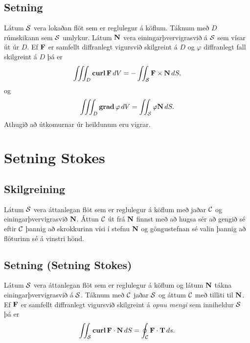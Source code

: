 \documentclass[a4paper,10pt,icelandic]{sphinxmanual}
\begin{document}
\subsection{Setning}
\label{Kafli6:id10}
Látum \(\cal S\) vera lokaðan flöt sem er reglulegur á köflum.
Táknum með \(D\) rúmskikann sem \(\cal S\) umlykur. Látum
\(\mbox{${\bf N}$}\) vera einingarþvervigrasvið á \(\cal S\) sem
vísar út úr \(D\). Ef \(\mbox{${\bf F}$}\) er samfellt
diffranlegt vigursvið skilgreint á \(D\) og \(\varphi\)
diffranlegt fall skilgreint á \(D\) þá er
\begin{gather}
\begin{split}\displaystyle \int\!\!\!\int\!\!\!\int_D\mbox{${\rm\bf curl\,}$}\mbox{${\bf F}$}\,dV=-\int\!\!\!\int_{\cal S}\mbox{${\bf F}$}\times\mbox{${\bf N}$}\,dS,\end{split}\notag
\end{gather}
og
\begin{gather}
\begin{split}\displaystyle \int\!\!\!\int\!\!\!\int_D\mbox{${\rm\bf grad\,}$}\varphi\,dV=\int\!\!\!\int_{\cal S}\varphi\mbox{${\bf N}$}\,dS.\end{split}\notag
\end{gather}
Athugið að útkomurnar úr heildunum eru vigrar.


\section{Setning Stokes}
\label{Kafli6:setning-stokes}

\subsection{Skilgreining}
\label{Kafli6:id11}
Látum \(\cal S\) vera áttanlegan flöt sem er reglulegur á köflum með
jaðar \(\cal C\) og einingarþvervigrasvið \(\mbox{${\bf N}$}\).
Áttun \(\cal C\) út frá \(\mbox{${\bf N}$}\) finnst með að hugsa
sér að gengið sé eftir \(\cal C\) þannig að skrokkurinn vísi í
stefnu \(\mbox{${\bf N}$}\) og göngustefnan sé valin þannig að
flöturinn sé á vinstri hönd.


\subsection{Setning (Setning Stokes)}
\label{Kafli6:setning-setning-stokes}
Látum \(\cal S\) vera áttanlegan flöt sem er reglulegur á köflum og
látum \(\mbox{${\bf N}$}\) tákna einingarþvervigrasvið á
\(\cal S\). Táknum með \(\cal C\) jaðar \(\cal S\) og áttum
\(\cal C\) með tilliti til \(\mbox{${\bf N}$}\). Ef
\(\mbox{${\bf F}$}\) er samfellt diffranlegt vigursvið skilgreint á
\textit{opnu mengi} sem inniheldur \(\cal S\) þá er
\begin{gather}
\begin{split}\displaystyle \int\!\!\!\int_{\cal S} \mbox{${\rm\bf curl\,}$}\mbox{${\bf F}$}\cdot\mbox{${\bf N}$}\,dS=\oint_{\cal C}\mbox{${\bf F}$}\cdot \mbox{${\bf T}$}\,ds.\end{split}\notag
\end{gather}
\end{document}
